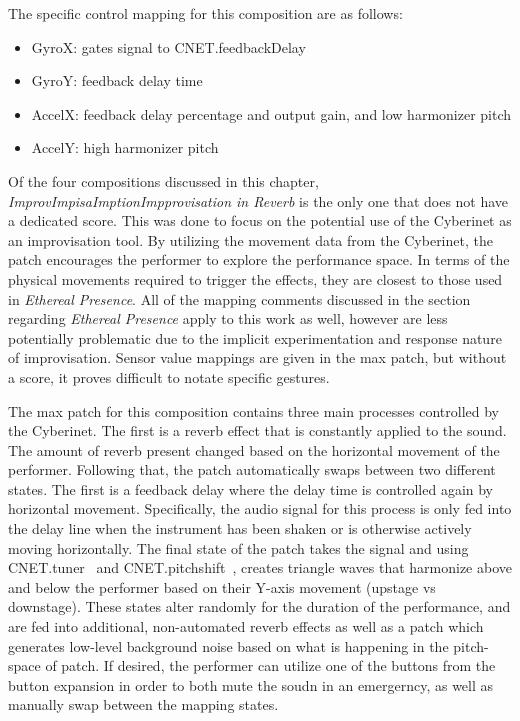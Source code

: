The specific control mapping for this composition are as follows: 

\begin{itemize}
    \item GyroX: gates signal to CNET.feedbackDelay~
    \item GyroY: feedback delay time
    \item AccelX: feedback delay percentage and output gain, and low harmonizer pitch
    \item AccelY: high harmonizer pitch
\end{itemize}

Of the four compositions discussed in this chapter, \textit{ImprovImpisaImptionImpprovisation in Reverb} is the only one that does not have a dedicated score. This was done to focus on the potential use of the Cyberinet as an improvisation tool. By utilizing the movement data from the Cyberinet, the patch encourages the performer to explore the performance space. In terms of the physical movements required to trigger the effects, they are closest to those used in \textit{Ethereal Presence}. All of the mapping comments discussed in the section regarding \textit{Ethereal Presence} apply to this work as well, however are less potentially problematic due to the implicit experimentation and response nature of improvisation. Sensor value mappings are given in the max patch, but without a score, it proves difficult to notate specific gestures.

The max patch for this composition contains three main processes controlled by the Cyberinet. The first is a reverb effect that is constantly applied to the sound. The amount of reverb present changed based on the horizontal movement of the performer. Following that, the patch automatically swaps between two different states. The first is a feedback delay where the delay time is controlled again by horizontal movement. Specifically, the audio signal for this process is only fed into the delay line when the instrument has been shaken or is otherwise actively moving horizontally. The final state of the patch takes the signal and using CNET.tuner~ and CNET.pitchshift~, creates triangle waves that harmonize above and below the performer based on their Y-axis movement (upstage vs downstage). These states alter randomly for the duration of the performance, and are fed into additional, non-automated reverb effects as well as a patch which generates low-level background noise based on what is happening in the pitch-space of patch. If desired, the performer can utilize one of the buttons from the button expansion in order to both mute the soudn in an emergerncy, as well as manually swap between the mapping states.

